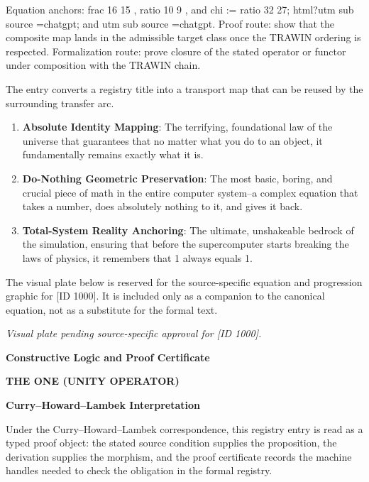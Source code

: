 Equation anchors: frac 16 15 , ratio 10 9 , and chi := ratio 32 27; html?utm sub source =chatgpt; and utm sub source =chatgpt. Proof route: show that the composite map lands in the admissible target class once the TRAWIN ordering is respected. Formalization route: prove closure of the stated operator or functor under composition with the TRAWIN chain.

The entry converts a registry title into a transport map that can be reused by the surrounding transfer arc.
\endgroup

\begin{enumerate}[leftmargin=1.6em,itemsep=6pt,topsep=4pt]
\item \textbf{Absolute Identity Mapping}: The terrifying, foundational law of the universe that guarantees that no matter what you do to an object, it fundamentally remains exactly what it is.
\item \textbf{Do-Nothing Geometric Preservation}: The most basic, boring, and crucial piece of math in the entire computer system--a complex equation that takes a number, does absolutely nothing to it, and gives it back.
\item \textbf{Total-System Reality Anchoring}: The ultimate, unshakeable bedrock of the simulation, ensuring that before the supercomputer starts breaking the laws of physics, it remembers that 1 always equals 1.
\end{enumerate}

\begingroup\footnotesize\sloppy
The visual plate below is reserved for the source-specific equation and progression graphic for [ID 1000]. It is included only as a companion to the canonical equation, not as a substitute for the formal text.
\par\endgroup
\begingroup\footnotesize\itshape
Visual plate pending source-specific approval for [ID 1000].
\par\endgroup

\clearpage
\begingroup\tzpsupportsetup
\noindent\textbf{\fontsize{10.8pt}{12.8pt}\selectfont [ID 1000] Constructive Logic and Proof Certificate}\par
\noindent\textbf{\fontsize{10pt}{12pt}\selectfont THE ONE (UNITY OPERATOR)}\par
\vspace{0.45em}
\begingroup
\footnotesize
\setlength{\parskip}{0.22em}
\setlength{\parindent}{0pt}
\noindent\textbf{Curry--Howard--Lambek Interpretation}\par
Under the Curry--Howard--Lambek correspondence, this registry entry is read as a typed proof
object: the stated source condition supplies the proposition, the derivation supplies the
morphism, and the proof certificate records the machine handles needed to check the obligation
in the formal registry.

